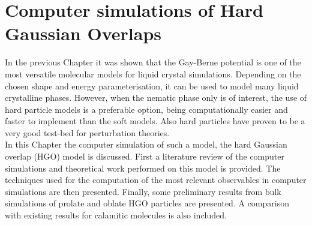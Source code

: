 
%


\chapter{Computer simulations of Hard Gaussian Overlaps}
\label{chap:three}


\introduction

In the previous Chapter it was shown that the Gay-Berne potential is one of the most versatile 
molecular models for liquid crystal simulations. Depending on the chosen shape and energy 
parameterisation, it can be used to model many liquid crystalline phases. 
However, when the nematic phase only is of interest, the use of
hard particle models is a preferable option, being computationally easier and faster to
implement than the soft models. Also hard particles have proven to be a very good test-bed
for perturbation theories.\\
In this Chapter the computer simulation of such a model, the hard Gaussian overlap (HGO) 
model is discussed.  First a literature review of the computer simulations and theoretical 
work performed on  this model is provided. The techniques used for the computation of the most
relevant observables in computer simulations are then presented. Finally, some preliminary
results from bulk simulations of prolate and oblate HGO particles 
are presented.  A comparison with existing results for calamitic molecules is also included.






